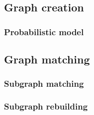 \subsection{Graph creation}

\subsubsection{Probabilistic model}

\subsection{Graph matching}

\subsubsection{Subgraph matching}

\subsubsection{Subgraph rebuilding}
